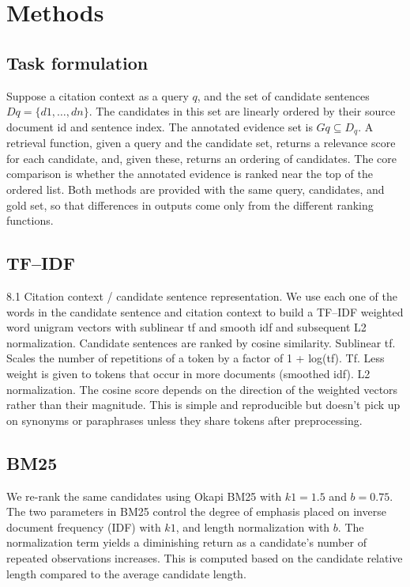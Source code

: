 \documentclass[11pt]{article}
\begin{document}
\section{Methods}
\subsection{Task formulation}
Suppose a citation context as a query $q$, and the set of candidate sentences $Dq=\{d1,\ldots, dn\}$. The candidates in this set are linearly ordered by their source document id and sentence index. The annotated evidence set is $Gq\subseteq D_q$. A retrieval function, given a query and the candidate set, returns a relevance score for each candidate, and, given these, returns an ordering of candidates. The core comparison is whether the annotated evidence is ranked near the top of the ordered list. Both methods are provided with the same query, candidates, and gold set, so that differences in outputs come only from the different ranking functions.

\subsection{TF--IDF}
8.1 Citation context / candidate sentence representation. We use each one of the words in the candidate sentence and citation context to build a TF--IDF weighted word unigram vectors with sublinear tf and smooth idf and subsequent L2 normalization. Candidate sentences are ranked by cosine similarity. Sublinear tf. Scales the number of repetitions of a token by a factor of 1 + log(tf). Tf. Less weight is given to tokens that occur in more documents (smoothed idf). L2 normalization. The cosine score depends on the direction of the weighted vectors rather than their magnitude. This is simple and reproducible but doesn't pick up on synonyms or paraphrases unless they share tokens after preprocessing.

\subsection{BM25}
We re-rank the same candidates using Okapi BM25 with $k1=1.5$ and $b=0.75$. The two parameters in BM25 control the degree of emphasis placed on inverse document frequency (IDF) with $k1$, and length normalization with $b$. The normalization term yields a diminishing return as a candidate's number of repeated observations increases. This is computed based on the candidate relative length compared to the average candidate length.
\end{document}
